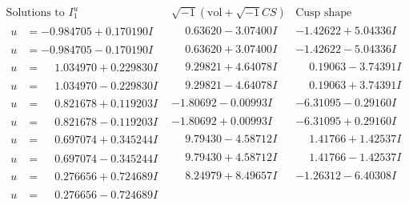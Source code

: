 \documentclass[1p]{elsarticle_modified}
\theoremstyle{definition}
\newcommand{\I}{\sqrt{-1}}
\begin{document}
$$\begin{array}{c|c|c}  
\text{Solutions to }I^u_{1}& \I (\text{vol} + \sqrt{-1}CS) & \text{Cusp shape}\\
 \hline 
\begin{aligned}
u &= -0.984705 + 0.170190 I\end{aligned}
 & \phantom{-}0.63620 - 3.07400 I & -1.42622 + 5.04336 I \\ \hline\begin{aligned}
u &= -0.984705 - 0.170190 I\end{aligned}
 & \phantom{-}0.63620 + 3.07400 I & -1.42622 - 5.04336 I \\ \hline\begin{aligned}
u &= \phantom{-}1.034970 + 0.229830 I\end{aligned}
 & \phantom{-}9.29821 + 4.64078 I & \phantom{-}0.19063 - 3.74391 I \\ \hline\begin{aligned}
u &= \phantom{-}1.034970 - 0.229830 I\end{aligned}
 & \phantom{-}9.29821 - 4.64078 I & \phantom{-}0.19063 + 3.74391 I \\ \hline\begin{aligned}
u &= \phantom{-}0.821678 + 0.119203 I\end{aligned}
 & -1.80692 - 0.00993 I & -6.31095 - 0.29160 I \\ \hline\begin{aligned}
u &= \phantom{-}0.821678 - 0.119203 I\end{aligned}
 & -1.80692 + 0.00993 I & -6.31095 + 0.29160 I \\ \hline\begin{aligned}
u &= \phantom{-}0.697074 + 0.345244 I\end{aligned}
 & \phantom{-}9.79430 - 4.58712 I & \phantom{-}1.41766 + 1.42537 I \\ \hline\begin{aligned}
u &= \phantom{-}0.697074 - 0.345244 I\end{aligned}
 & \phantom{-}9.79430 + 4.58712 I & \phantom{-}1.41766 - 1.42537 I \\ \hline\begin{aligned}
u &= \phantom{-}0.276656 + 0.724689 I\end{aligned}
 & \phantom{-}8.24979 + 8.49657 I & -1.26312 - 6.40308 I \\ \hline\begin{aligned}
u &= \phantom{-}0.276656 - 0.724689 I\end{aligned}

\end{array}$$
\end{document}
